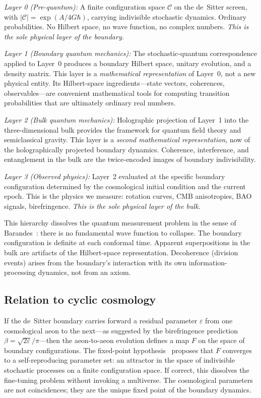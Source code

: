 \documentclass[aps,prd,twocolumn,superscriptaddress,nofootinbib]{revtex4-2}
\begin{document}
\emph{Layer 0 (Pre-quantum):} A finite configuration space $\mathcal{C}$ on the de~Sitter screen, with $|\mathcal{C}| = \exp(A/4G\hbar)$, carrying indivisible stochastic dynamics. Ordinary probabilities. No Hilbert space, no wave function, no complex numbers. \emph{This is the sole physical layer of the boundary.}

\emph{Layer 1 (Boundary quantum mechanics):} The stochastic-quantum correspondence applied to Layer~0 produces a boundary Hilbert space, unitary evolution, and a density matrix. This layer is a \emph{mathematical representation} of Layer~0, not a new physical entity. Its Hilbert-space ingredients---state vectors, coherences, observables---are convenient mathematical tools for computing transition probabilities that are ultimately ordinary real numbers.

\emph{Layer 2 (Bulk quantum mechanics):} Holographic projection of Layer~1 into the three-dimensional bulk provides the framework for quantum field theory and semiclassical gravity. This layer is a \emph{second mathematical representation}, now of the holographically projected boundary dynamics. Coherence, interference, and entanglement in the bulk are the twice-encoded images of boundary indivisibility.

\emph{Layer 3 (Observed physics):} Layer~2 evaluated at the specific boundary configuration determined by the cosmological initial condition and the current epoch. This is the physics we measure: rotation curves, CMB anisotropies, BAO signals, birefringence. \emph{This is the sole physical layer of the bulk.}

This hierarchy dissolves the quantum measurement problem in the sense of Barandes~\cite{Barandes2025QSIP}: there is no fundamental wave function to collapse. The boundary configuration is definite at each conformal time. Apparent superpositions in the bulk are artifacts of the Hilbert-space representation. Decoherence (division events) arises from the boundary's interaction with its own information-processing dynamics, not from an axiom.

\subsection{Relation to cyclic cosmology}

If the de~Sitter boundary carries forward a residual parameter $\varepsilon$ from one cosmological aeon to the next---as suggested by the birefringence prediction $\beta = \sqrt{2\varepsilon}/\pi$---then the aeon-to-aeon evolution defines a map $F$ on the space of boundary configurations. The fixed-point hypothesis~\cite{PaperXI} proposes that $F$ converges to a self-reproducing parameter set: an attractor in the space of indivisible stochastic processes on a finite configuration space. If correct, this dissolves the fine-tuning problem without invoking a multiverse. The cosmological parameters are not coincidences; they are the unique fixed point of the boundary dynamics.
\end{document}

